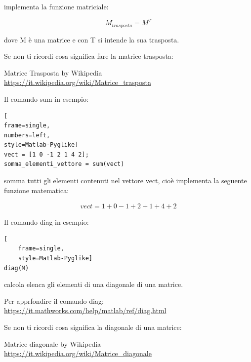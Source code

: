 implementa la funzione matriciale: 

{
    \Large 
    \begin{equation}
        M_{trasposta} = M^{T}
    \end{equation}
}

dove M è una matrice e con T si intende la sua trasposta. \newline 

\begin{tcolorbox}
    Se non ti ricordi cosa significa fare la matrice trasposta: \newline 

    Matrice Trasposta by Wikipedia \\ 
    \url{https://it.wikipedia.org/wiki/Matrice_trasposta}
\end{tcolorbox} 

Il comando sum in esempio: 

\begin{lstlisting}[
frame=single,
numbers=left,
style=Matlab-Pyglike]
vect = [1 0 -1 2 1 4 2]; 
somma_elementi_vettore = sum(vect)
\end{lstlisting}

somma tutti gli elementi contenuti nel vettore vect, cioè implementa la seguente funzione matematica: 

{
    \Large 
    \begin{equation}
        \begin{split}
    vect = 1 + 0 -1 +2 +1 +4 + 2        
        \end{split}
    \end{equation}
}

Il comando diag in esempio: 

\begin{lstlisting}[
    frame=single,
    style=Matlab-Pyglike]
diag(M)  
\end{lstlisting}

calcola elenca gli elementi di una diagonale di una matrice. \newline 

\begin{tcolorbox}
    Per apprfondire il comando diag: \\\url{https://it.mathworks.com/help/matlab/ref/diag.html} \newline 

    Se non ti ricordi cosa significa la diagonale di una matrice: \newline 

    Matrice diagonale by Wikipedia \\  
    \url{https://it.wikipedia.org/wiki/Matrice_diagonale}
\end{tcolorbox}

